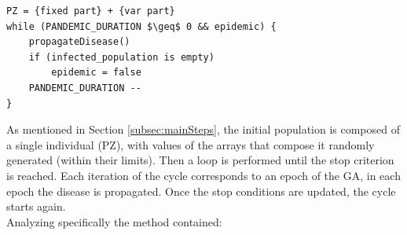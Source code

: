 \documentclass[letterpaper]{article}%
\begin{document}
\lstset{language=Python}
\lstset{frame=lines}
\lstset{basicstyle=\footnotesize}
\lstset{showstringspaces=false}
\lstset{numbers=left}				
\lstset{stepnumber=1}
\begin{lstlisting}[mathescape=true]
PZ = {fixed part} + {var part}
while (PANDEMIC_DURATION $\geq$ 0 && epidemic) {
    propagateDisease()
    if (infected_population is empty)
        epidemic = false
    PANDEMIC_DURATION --
}
\end{lstlisting}
As mentioned in Section \ref{subsec:mainSteps}, the initial population is composed of a single individual (PZ), with values of the arrays that compose it randomly generated (within their limits). Then a loop is performed until the stop criterion is reached. Each iteration of the cycle corresponds to an epoch of the GA, in each epoch the disease is propagated. Once the stop conditions are updated, the cycle starts again.\\
Analyzing specifically the method contained:
\end{document}
